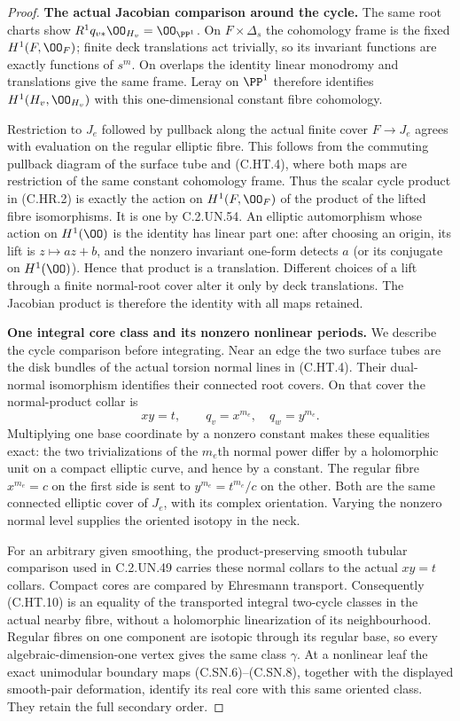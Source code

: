 \begin{proof}
\par\medskip\noindent\textbf{The actual Jacobian comparison around the cycle.}
The same root charts show $R^1q_{v*}\OO_{H_v}=\OO_{\PP^1}$.
On $F\times\Delta_s$ the cohomology frame is the fixed
$H^1(F,\OO_F)$; finite deck translations act trivially, so its
invariant functions are exactly functions of $s^m$. On overlaps
the identity linear monodromy and translations give the same
frame. Leray on $\PP^1$ therefore identifies
$H^1(H_v,\OO_{H_v})$ with this one-dimensional constant fibre
cohomology.

Restriction to $J_e$ followed by pullback along the actual finite
cover $F\to J_e$ agrees with evaluation on the regular elliptic
fibre. This follows from the commuting pullback diagram of the
surface tube and (C.HT.4), where both maps are restriction of the
same constant cohomology frame. Thus the scalar cycle product
in (C.HR.2) is exactly the action on $H^1(F,\OO_F)$ of the product
of the lifted fibre isomorphisms. It is one by C.2.UN.54.
An elliptic automorphism whose action on $H^1(\OO)$ is the identity
has linear part one: after choosing an origin, its lift is
$z\mapsto az+b$, and the nonzero invariant one-form detects $a$
(or its conjugate on $H^1(\OO)$). Hence that product is a
translation. Different choices of a lift through a finite
normal-root cover alter it only by deck translations. The
Jacobian product is therefore the identity with all maps retained.

\par\medskip\noindent\textbf{One integral core class and its nonzero nonlinear periods.}
We describe the cycle comparison before integrating. Near an
edge the two surface tubes are the disk bundles of the actual
torsion normal lines in (C.HT.4). Their dual-normal isomorphism
identifies their connected root covers. On that cover the
normal-product collar is
\[
                  xy=t,\qquad q_v=x^{m_e},\quad
                  q_w=y^{m_e}.                         \tag{C.HT.10}
\]
Multiplying one base coordinate by a nonzero constant makes these
equalities exact: the two trivializations of the $m_e$th normal
power differ by a holomorphic unit on a compact elliptic curve,
and hence by a constant. The regular fibre $x^{m_e}=c$ on the
first side is sent to $y^{m_e}=t^{m_e}/c$ on the other. Both are
the same connected elliptic cover of $J_e$, with its complex
orientation. Varying the nonzero normal level supplies the
oriented isotopy in the neck.

For an arbitrary given smoothing, the product-preserving smooth
tubular comparison used in C.2.UN.49 carries these normal collars
to the actual $xy=t$ collars. Compact cores are compared by
Ehresmann transport. Consequently (C.HT.10) is an equality of
the transported integral two-cycle classes in the actual nearby
fibre, without a holomorphic linearization of its neighbourhood.
Regular fibres on one component are isotopic through its regular
base, so every algebraic-dimension-one vertex gives the same
class $\gamma$. At a nonlinear leaf the exact unimodular
boundary maps (C.SN.6)--(C.SN.8), together with the displayed
smooth-pair deformation, identify its real core with this same
oriented class. They retain the full secondary order.


\end{proof}
